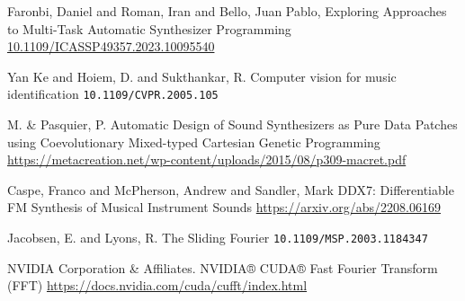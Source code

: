\documentclass[]{beamer}
\begin{document}
\begin{frame}
  \begin{thebibliography}{99} %
   Faronbi, Daniel and Roman, Iran and Bello, Juan Pablo,
  \newblock Exploring Approaches to Multi-Task Automatic Synthesizer Programming
  \newblock \url{10.1109/ICASSP49357.2023.10095540}

   Yan Ke and Hoiem, D. and Sukthankar, R.
  \newblock Computer vision for music identification
  \newblock \texttt{10.1109/CVPR.2005.105}

   M. & Pasquier, P.
  \newblock Automatic Design of Sound Synthesizers as Pure Data Patches using Coevolutionary Mixed-typed Cartesian Genetic Programming
  \newblock \url{https://metacreation.net/wp-content/uploads/2015/08/p309-macret.pdf}

  \end{thebibliography}
\end{frame}

\begin{frame}
  \begin{thebibliography}{99} %

     Caspe, Franco and McPherson, Andrew and Sandler, Mark
    \newblock DDX7: Differentiable FM Synthesis of Musical Instrument Sounds
    \newblock \url{https://arxiv.org/abs/2208.06169}

     Jacobsen, E. and Lyons, R.
    \newblock The Sliding Fourier
    \newblock \texttt{10.1109/MSP.2003.1184347}

     NVIDIA Corporation & Affiliates.
    \newblock NVIDIA® CUDA® Fast Fourier Transform (FFT)
    \newblock \url{https://docs.nvidia.com/cuda/cufft/index.html}

  \end{thebibliography}
\end{frame}
\end{document}
